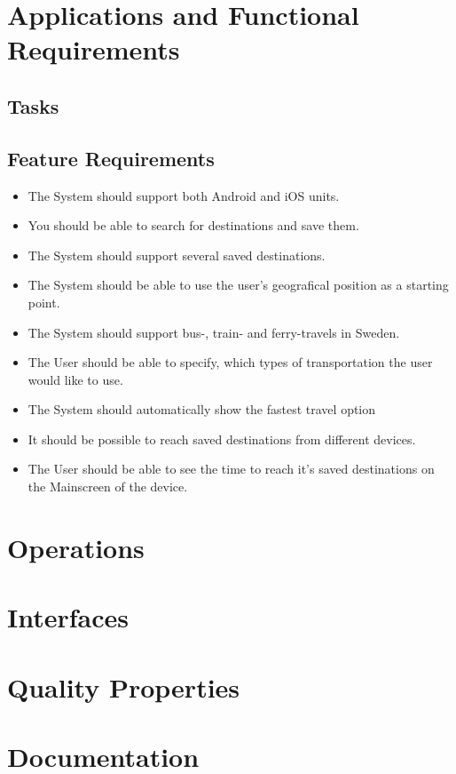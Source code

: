 \documentclass[a4paper]{article}
\begin{document}
	\section{Applications and Functional Requirements}
	\subsection{Tasks}
			
	\subsection{Feature Requirements}
	\begin{itemize}
			\item The System should support both Android and iOS units.
			\item You should be able to search for destinations and save them.
			\item The System should support several saved destinations.
			\item The System should be able to use the user's geografical position as a starting point.
			\item The System should support bus-, train- and ferry-travels in Sweden.
			\item The User should be able to specify, which types of transportation the user would like to use. 
			\item The System should automatically show the fastest travel option
			\item It should be possible to reach saved destinations from different devices.
			\item The User should be able to see the time to reach it's saved destinations on the Mainscreen of the device.
		\end{itemize}
	\section{Operations}
	\section{Interfaces}
	\section{Quality Properties}
	\section{Documentation}
	
\end{document}
